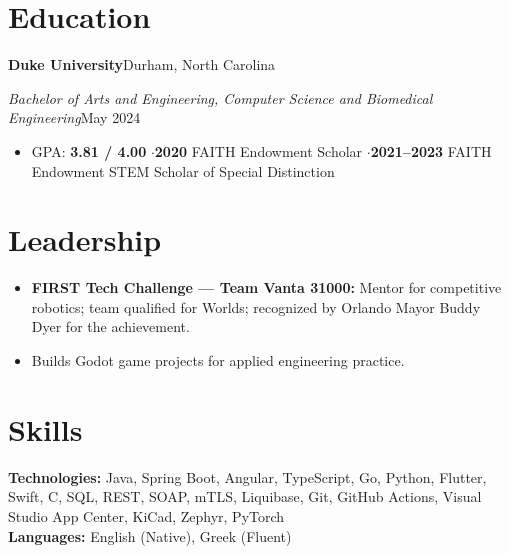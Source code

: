 \documentclass[10pt,letterpaper]{article}
\newcommand{\entry}[2]{%
  \noindent\textbf{#1}\hfill #2\par\vspace{-1pt}%
}
\newcommand{\subentry}[2]{%
  \noindent\textit{#1}\hfill #2\par\vspace{1pt}%
}
\begin{document}
\section{Education}

\entry{Duke University}{Durham, North Carolina}
\subentry{Bachelor of Arts and Engineering, Computer Science and Biomedical Engineering}{May 2024}
\begin{itemize}
  \item GPA: \textbf{3.81 / 4.00} \enspace$\cdot$\enspace \textbf{2020} FAITH Endowment Scholar \enspace$\cdot$\enspace \textbf{2021--2023} FAITH Endowment STEM Scholar of Special Distinction
\end{itemize}

\section{Leadership}

\begin{itemize}
  \item \textbf{FIRST Tech Challenge --- Team Vanta 31000:} Mentor for competitive robotics; team qualified for Worlds; recognized by Orlando Mayor Buddy Dyer for the achievement.
  \item Builds Godot game projects for applied engineering practice.
\end{itemize}

\section{Skills}

\textbf{Technologies:} Java, Spring Boot, Angular, TypeScript, Go, Python, Flutter, Swift, C, SQL, REST, SOAP, mTLS, Liquibase, Git, GitHub Actions, Visual Studio App Center, KiCad, Zephyr, PyTorch\\[2pt]
\textbf{Languages:} English (Native), Greek (Fluent)
\end{document}
